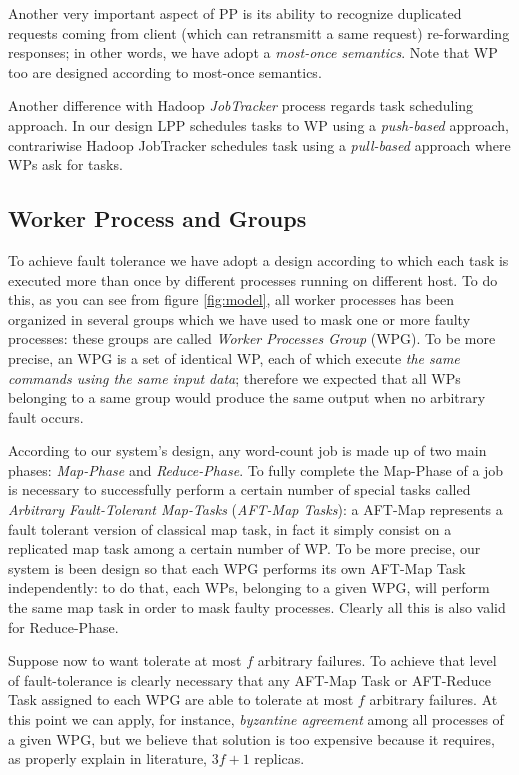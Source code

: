 \documentclass[sigchi]{acmart}
\begin{document}
Another very important aspect of PP is its ability to recognize duplicated requests coming from client (which can retransmitt a same request) re-forwarding responses; in other words, we have adopt a \textit{most-once semantics}. Note that WP too are designed according to most-once semantics.

Another difference with Hadoop \textit{JobTracker} process regards task scheduling approach. In our design LPP schedules tasks to WP using a \textit{push-based} approach, contrariwise Hadoop JobTracker schedules task using a \textit{pull-based} approach where WPs ask for tasks\cite{LARTS}.

\subsection{Worker Process and Groups}

To achieve fault tolerance we have adopt a design according to which each task is executed more than once by different processes running on different host. To do this, as you can see from figure \ref{fig:model}, all worker processes has been organized in several groups which we have used to mask one or more faulty processes: these groups are called \textit{Worker Processes Group} (WPG). To be more precise, an WPG is a set of identical WP, each of which execute \textit{the same commands using the same input data}; therefore we expected that all WPs belonging to a same group would produce the same output when no arbitrary fault occurs. 

According to our system's design, any word-count job is made up of two main phases: \textit{Map-Phase} and \textit{Reduce-Phase}. To fully complete the Map-Phase of a job is necessary to successfully perform a certain number of special tasks called \textit{Arbitrary Fault-Tolerant Map-Tasks} (\textit{AFT-Map Tasks}): a AFT-Map represents a fault tolerant version of classical map task, in fact it simply consist on a replicated map task among a certain number of WP. To be more precise, our system is been design so that each WPG performs its own AFT-Map Task independently: to do that, each WPs, belonging to a given WPG, will perform the same map task in order to mask faulty processes. Clearly all this is also valid for Reduce-Phase.

Suppose now to want tolerate at most $f$ arbitrary failures. To achieve that level of fault-tolerance is clearly necessary that any AFT-Map Task or AFT-Reduce Task assigned to each WPG are able to tolerate at most $f$ arbitrary failures. At this point we can apply, for instance, \textit{byzantine agreement} among all processes of a given WPG, but we believe that solution is too expensive because it requires, as properly explain in literature\citep{SDCC}, $3f + 1$ replicas.
\end{document}
